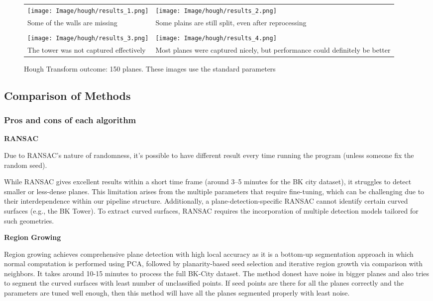 \documentclass[a4paper,9pt]{article}
\begin{document}
\begin{figure}[H]
    \begin{tabularx}{\textwidth}{XX}
        \texttt{[image: Image/hough/results\_1.png]} & 
        \texttt{[image: Image/hough/results\_2.png]} \\
        Some of the walls are missing & Some plains are still split, even after reprocessing \\\\
        \texttt{[image: Image/hough/results\_3.png]} & 
        \texttt{[image: Image/hough/results\_4.png]} \\
        The tower was not captured effectively & Most planes were captured nicely, but performance could definitely be better
    \end{tabularx}
    \caption{Hough Transform outcome: 150 planes. These images use the standard parameters}
\end{figure}




\subsection{Comparison of Methods}
\subsubsection{Pros and cons of each algorithm}

\textbf{RANSAC}
\par
Due to RANSAC's nature of randomness, it's possible to have different result every time running the program (unless someone fix the random seed). 
\\\par
While RANSAC gives excellent results within a short time frame (around 3–5 minutes for the BK city dataset), it struggles to detect smaller or less-dense planes. This limitation arises from the multiple parameters that require fine-tuning, which can be challenging due to their interdependence within our pipeline structure. Additionally, a plane-detection-specific RANSAC cannot identify certain curved surfaces (e.g., the BK Tower). To extract curved surfaces, RANSAC requires the incorporation of multiple detection models tailored for such geometries.
\\\par
\textbf{Region Growing}
\par
Region growing achieves comprehensive plane detection with high local accuracy as it is a bottom-up segmentation approach in which normal computation is performed using PCA, followed by planarity-based seed selection and iterative region growth via comparison with neighbors. It takes around 10-15 minutes to process the full BK-City dataset. The method donest have noise in bigger planes and also tries to segment the curved surfaces with least number of unclassified points. If seed points are there for all the planes correctly and the parameters are tuned well enough, then this method will have all the planes segmented properly with least noise.
\end{document}
